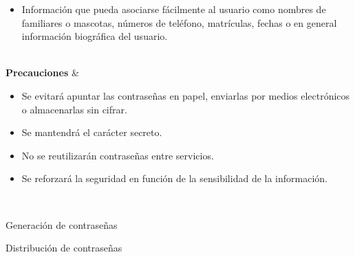 \begin{enumerate}[label=\alph*)]
\begin{table}[H]
{\begin{itemize}[leftmargin=1em, topsep=0pt, itemsep=0pt]
            \item Información que pueda asociarse fácilmente al usuario como nombres de familiares o mascotas, números de teléfono, matrículas, fechas o en general información biográfica del usuario.
            \end{itemize} \\ \hline
            \textbf{Precauciones} &
            \begin{itemize}[leftmargin=1em, topsep=0pt, itemsep=0pt]
            \item Se evitará apuntar las contraseñas en papel, enviarlas por medios electrónicos o almacenarlas sin cifrar.
            \item Se mantendrá el carácter secreto.
            \item No se reutilizarán contraseñas entre servicios.
            \item Se reforzará la seguridad en función de la sensibilidad de la información.
            \end{itemize} \\ \hline
        }
        \caption{Generación de contraseñas}
        \label{tab:guia-sgsi-generación-contraseñas}
        \normalsize
    \end{table}

    \vspace{1em}

    \begin{table}[H]
        \centering
        \small
        \caption{Distribución de contraseñas}
        \label{tab:guia-sgsi-distribución-contraseñas}
        \normalsize
    \end{table}

    \vspace{1em}


\end{enumerate}
